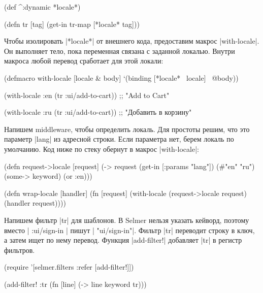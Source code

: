 \begin{english}
  \begin{clojure}
(def ^:dynamic *locale*)

(defn tr [tag]
  (get-in tr-map [*locale* tag]))
  \end{clojure}
\end{english}

Чтобы изолировать \spverb|*locale*| от внешнего кода, предоставим макрос
\spverb|with-locale|. Он выполняет тело, пока переменная связана с заданной
локалью. Внутри макроса любой перевод сработает для этой локали:

  \begin{clojure}
(defmacro with-locale
  [locale & body]
  `(binding [*locale* ~locale]
     ~@body))

(with-locale :en
  (tr :ui/add-to-cart))
;; "Add to Cart"

(with-locale :ru
  (tr :ui/add-to-cart))
;; "Добавить в корзину"
  \end{clojure}

Напишем middleware, чтобы определить локаль. Для простоты решим, что это
параметр \spverb|lang| из адресной строки. Если параметра нет, берем локаль по
умолчанию. Код ниже по стеку обернут в макрос \spverb|with-locale|:

\begin{english}
  \begin{clojure}
(defn request->locale [request]
  (-> request
      (get-in [:params "lang"])
      (#{"en" "ru"})
      (some-> keyword)
      (or :en)))

(defn wrap-locale [handler]
  (fn [request]
    (with-locale (request->locale request)
      (handler request))))
  \end{clojure}
\end{english}

Напишем фильтр \spverb|tr| для шаблонов. В Selmer нельзя указать кейворд,
поэтому вместо \spverb|{{ :ui/sign-in }}| пишут \spverb|{{ "ui/sign-in"}}|.
Фильтр \spverb|tr| переводит строку в ключ, а затем ищет по нему
перевод. Функция \spverb|add-filter!| добавляет \spverb|tr| в регистр фильтров.

\begin{english}
  \begin{clojure}
(require '[selmer.filters :refer [add-filter!]])

(add-filter! :tr
 (fn [line]
   (-> line keyword tr)))
  \end{clojure}
\end{english}

